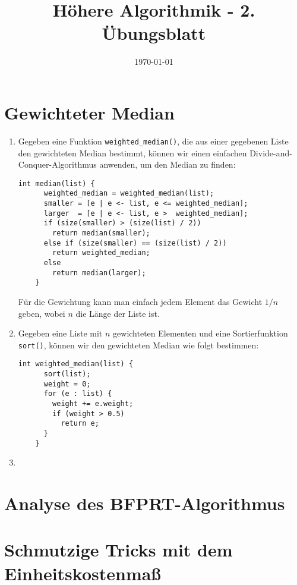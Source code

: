 \documentclass[a4paper,10pt]{scrartcl}
\title{H\"ohere Algorithmik - 2. \"Ubungsblatt}
\author{\Authors}
\date{\today}
\begin{document}
\maketitle

\section{Gewichteter Median}
\begin{enumerate}
\item	Gegeben eine Funktion \texttt{weighted\_median()}, die
	aus einer gegebenen Liste den gewichteten Median bestimmt,
	können wir einen einfachen Divide-and-Conquer-Algorithmus
	anwenden, um den Median zu finden:

	\begin{lstlisting}[numbers=none]
	int median(list) {
	  weighted_median = weighted_median(list);
	  smaller = [e | e <- list, e <= weighted_median];
	  larger  = [e | e <- list, e >  weighted_median];
	  if (size(smaller) > (size(list) / 2))
	    return median(smaller);
	  else if (size(smaller) == (size(list) / 2))
	    return weighted_median;
	  else
	    return median(larger);
	}
	\end{lstlisting}

	Für die Gewichtung kann man einfach jedem Element das Gewicht
	$1/n$ geben, wobei $n$ die Länge der Liste ist.

\item	Gegeben eine Liste mit $n$ gewichteten Elementen und eine
	Sortierfunktion \texttt{sort()}, können wir den gewichteten
	Median wie folgt bestimmen:

	\begin{lstlisting}[numbers=none]
	int weighted_median(list) {
	  sort(list);
	  weight = 0;
	  for (e : list) {
	    weight += e.weight;
	    if (weight > 0.5)
	      return e;
	  }
	}
	\end{lstlisting}

\item

\end{enumerate}

\section{Analyse des BFPRT-Algorithmus}

\section{Schmutzige Tricks mit dem Einheitskostenmaß}
\end{document}

